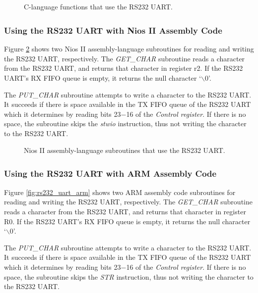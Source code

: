 \documentclass[11pt, twoside, pdftex]{article}
\begin{document}
\begin{figure}[h!]

\caption{C-language functions that use the RS232 UART.}
   \label{fig:rs232_uart_c}
\end{figure}

\subsubsection{Using the RS232 UART with Nios\textsuperscript{\textregistered} II Assembly Code}
\label{sec:rs232_nios}

Figure \ref{fig:rs232_uart_nios} shows two Nios II assembly-language subroutines for reading and writing the RS232 UART, respectively. 
The \textit{GET\_CHAR} subroutine reads a character from the RS232 UART, and returns that character in register r2. If the RS232 UART's RX FIFO queue is empty, it returns the null character `$\backslash$0'. 

The \textit{PUT\_CHAR} subroutine attempts to write a character to the RS232 UART. It succeeds if there is space available in the TX FIFO queue of the RS232 UART which it determines by reading bits 23$-$16 of the \textit{Control register}. If there is no space, the subroutine skips the \textit{stwio} instruction, thus not writing the character to the RS232 UART.

\begin{figure}[h!]

\caption{Nios II assembly-language subroutines that use the RS232
UART.}
   \label{fig:rs232_uart_nios}
\end{figure}
\pagebreak
\clearpage
\newpage


\subsubsection{Using the RS232 UART with ARM\textsuperscript{\textregistered} Assembly Code}
\label{sec:rs232_arm}

Figure \ref{fig:rs232_uart_arm} shows two ARM assembly code subroutines for reading and writing the RS232 UART, respectively. 
The \textit{GET\_CHAR} subroutine reads a character from the RS232 UART, and returns that character in register R0. If the RS232 UART's RX FIFO queue is empty, it returns the null character `$\backslash$0'.

The \textit{PUT\_CHAR} subroutine attempts to write a character to the RS232 UART. It succeeds if there is space available in the TX FIFO queue of the RS232 UART which it determines by reading bits 23$-$16 of the \textit{Control register}. If there is no space, the subroutine skips the \textit{STR} instruction, thus not writing the character to the RS232 UART.
\end{document}
